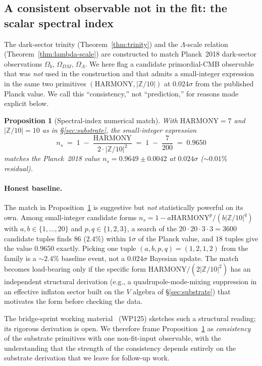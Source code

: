 \documentclass[11pt,reqno]{amsart}
\theoremstyle{plain}
\newtheorem{proposition}[theorem]{Proposition}
\theoremstyle{definition}
\theoremstyle{remark}
\newcommand{\Z}{\mathbb{Z}}
\begin{document}
\subsection{A consistent observable not in the fit: the scalar spectral index}\label{sec:prediction}

The dark-sector trinity (Theorem~\ref{thm:trinity}) and the
$\Lambda$-scale relation (Theorem~\ref{thm:lambda-scale}) are
constructed to match Planck~2018 dark-sector observations
$\Omega_b$, $\Omega_{DM}$, $\Omega_\Lambda$. We here flag a
candidate primordial-CMB observable that was \emph{not} used in
the construction and that admits a small-integer expression in
the same two primitives $(\mathrm{HARMONY}, |\Z/10|)$ at
$0.024\sigma$ from the published Planck value. We call this
``consistency,'' not ``prediction,'' for reasons made explicit
below.

\begin{proposition}[Spectral-index numerical match]\label{prop:ns}
With $\mathrm{HARMONY} = 7$ and $|\Z/10| = 10$ as in
\S\ref{sec:substrate}, the small-integer expression
\[
  n_s \;=\; 1 \;-\; \frac{\mathrm{HARMONY}}{2 \cdot |\Z/10|^{2}}
  \;=\; 1 \;-\; \frac{7}{200} \;=\; 0.9650
\]
matches the Planck~2018 value $n_s = 0.9649 \pm 0.0042$
\cite{Planck2018} at $0.024\sigma$ ($\sim 0.01\%$ residual).
\end{proposition}

\paragraph{Honest baseline.}
The match in Proposition~\ref{prop:ns} is suggestive but
\emph{not} statistically powerful on its own. Among small-integer
candidate forms
$n_s = 1 - a \mathrm{HARMONY}^{p} / (b |\Z/10|^{q})$ with
$a, b \in \{1, \dots, 20\}$ and $p, q \in \{1, 2, 3\}$, a search
of the $20 \cdot 20 \cdot 3 \cdot 3 = 3600$ candidate tuples
finds $86$ ($2.4\%$) within $1\sigma$ of the Planck value, and
$18$ tuples give the value $0.9650$ exactly. Picking one tuple
$(a, b, p, q) = (1, 2, 1, 2)$ from the family is a $\sim 2.4\%$
baseline event, not a $0.024\sigma$ Bayesian update. The match
becomes load-bearing only if the specific form
$\mathrm{HARMONY}/(2 |\Z/10|^{2})$ has an independent structural
derivation (e.g., a quadrupole-mode-mixing suppression in an
effective inflaton sector built on the $V$ algebra of
\S\ref{sec:substrate}) that motivates the form before checking
the data.

The bridge-sprint working
material~\cite{SandersClaudeChat2026BridgeSprint} (WP125)
sketches such a structural reading; its rigorous derivation is
open. We therefore frame Proposition~\ref{prop:ns} as
\emph{consistency} of the substrate primitives with one
non-fit-input observable, with the understanding that the
strength of the consistency depends entirely on the substrate
derivation that we leave for follow-up work.
\end{document}
